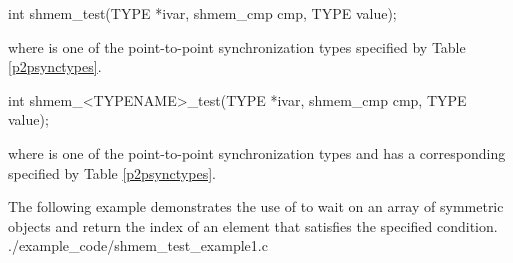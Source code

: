 
\begin{apidefinition}

\begin{C11synopsis}
int shmem_test(TYPE *ivar, shmem_cmp cmp, TYPE value);
\end{C11synopsis}
where \TYPE{} is one of the point-to-point synchronization types specified by
Table \ref{p2psynctypes}.

\begin{Csynopsis}
int shmem_<TYPENAME>_test(TYPE *ivar, shmem_cmp cmp, TYPE value);
\end{Csynopsis}
where \TYPE{} is one of the point-to-point synchronization types and has a
corresponding \TYPENAME{} specified by Table \ref{p2psynctypes}.

\begin{apiarguments}


\end{apiarguments}




\begin{apiexamples}
  \apicexample
      {The following example demonstrates the use of  to
        wait on an array of symmetric objects and return the index of an
        element that satisfies the specified condition.}
      {./example_code/shmem_test_example1.c}
      {}
\end{apiexamples}

\end{apidefinition}
